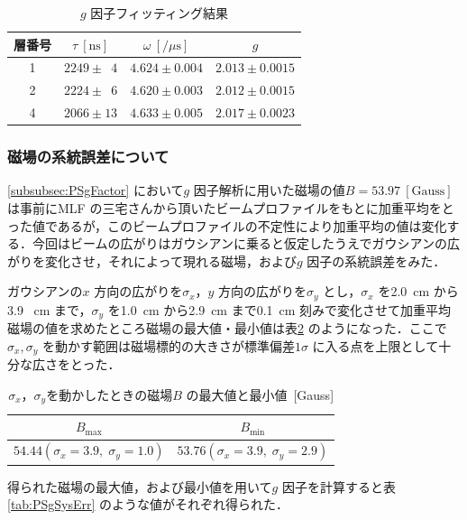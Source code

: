 \begin{table}[h]
	\centering
	\caption{$g$ 因子フィッティング結果}
	\begin{tabular}{cccc} \toprule
	層番号 & $\tau~[\mathrm{ns}]$ & $\omega~[/ \mu\mathrm{s}]$ & $g$ \\ \midrule
	1 & $2249 \pm \phantom{0}4$ & $4.624 \pm 0.004$ & $2.013 \pm 0.0015$ \\  
	2 & $2224 \pm \phantom{0}6$ & $4.620 \pm 0.003$ & $2.012 \pm 0.0015$ \\  
	4 & $2066 \pm 13$ & $4.633 \pm 0.005$ & $2.017 \pm 0.0023$ \\  \bottomrule
	\end{tabular}\label{tab:PSgFactor}
\end{table}%

\newpage

\subsubsection{磁場の系統誤差について}
\label{subsubsec:MagSysErr}
\ref{subsubsec:PSgFactor} において$g$ 因子解析に用いた磁場の値$B = 53.97~[\mathrm{Gauss}]$ は事前にMLF の三宅さんから頂いたビームプロファイルをもとに加重平均をとった値であるが，このビームプロファイルの不定性により加重平均の値は変化する．今回はビームの広がりはガウシアンに乗ると仮定したうえでガウシアンの広がりを変化させ，それによって現れる磁場，および$g$ 因子の系統誤差をみた．

ガウシアンの$x$ 方向の広がりを$\sigma_{x}$，$y$ 方向の広がりを$\sigma_{y}$ とし，$\sigma_{x}$ を2.0~cm から3.9 ~cm まで，$\sigma_{y}$ を1.0~cm から2.9~cm まで0.1~cm 刻みで変化させて加重平均磁場の値を求めたところ磁場の最大値・最小値は表\ref{tab:MagSysErr} のようになった．ここで$\sigma_{x}, \sigma_{y}$ を動かす範囲は磁場標的の大きさが標準偏差$1\sigma$ に入る点を上限として十分な広さをとった．

\begin{table}[h]
	\centering
	\caption{$\sigma_{x}$，$\sigma_{y}$を動かしたときの磁場$B$ の最大値と最小値~[Gauss]}
	\begin{tabular}{cc}\toprule
	$B_{\mathrm{max}}$ & $B_{\mathrm{min}}$ \\ \midrule
	$54.44 (\sigma_{x} = 3.9, \;\sigma_{y} = 1.0)$ & $53.76 (\sigma_{x} = 3.9,\;\sigma_{y} = 2.9)$ \\ \bottomrule 	
	\end{tabular}\label{tab:MagSysErr}
\end{table}%

得られた磁場の最大値，および最小値を用いて$g$ 因子を計算すると表\ref{tab:PSgSysErr} のような値がそれぞれ得られた．

